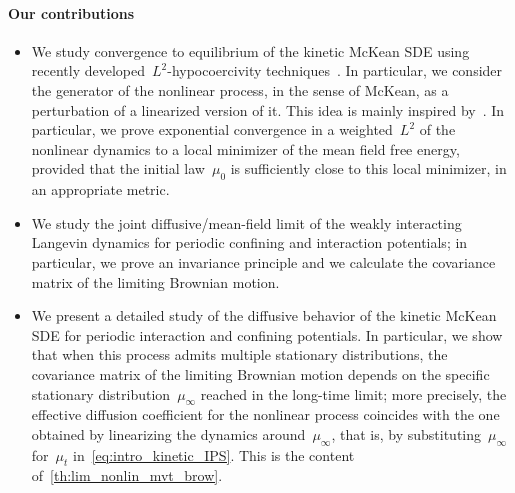 \documentclass[onefignum,onetabnum]{siamart251216} %
\theoremstyle{plain}
\numberwithin{equation}{section}
\numberwithin{theorem}{section}
\newcounter{ucounter}
\newcommand{\uv}[1]{
  \stepcounter{ucounter}
  \textcolor{orange}{
      \\[.2cm]
    U, comment \arabic{ucounter}. #1
    \\[.2cm]
  }
}
\renewcommand{\uv}[1]{\textcolor{orange}{#1}}
\begin{document}
\paragraph{Our contributions} %
\begin{itemize}

    \item
        We study convergence to equilibrium of the kinetic McKean SDE using recently developed~$L^2$-hypocoercivity techniques~\cite{dolbeault2015hypocoercivity,roussel2018spectral}. In particular, we consider the generator of the nonlinear process, in the sense of McKean, as a perturbation of a linearized version of it. This idea is mainly inspired by~\cite{pavliotis2025linearizationergodicmckeansdes}.
        In particular, we prove exponential convergence in a weighted~$L^2$ of the nonlinear dynamics to a local minimizer of the mean field free energy, provided that the initial law~$\mu_0$ is sufficiently close to this local minimizer, in an appropriate metric.
    \item We study the joint diffusive/mean-field limit of the weakly interacting Langevin dynamics for periodic confining and interaction potentials; in particular, we prove an invariance principle and we calculate the covariance matrix of the limiting Brownian motion.


    \item
        We present a detailed study of the diffusive behavior of the kinetic McKean SDE for periodic interaction and confining potentials. In particular, we show that when this process admits multiple stationary distributions,
        the covariance matrix of the limiting Brownian motion depends on the specific stationary distribution~$\mu_{\infty}$ reached in the long-time limit; more precisely, the effective diffusion coefficient for the nonlinear process coincides with the one obtained by linearizing the dynamics around~$\mu_{\infty}$,
        that is, by substituting~$\mu_{\infty}$ for~$\mu_t$ in~\eqref{eq:intro_kinetic_IPS}.
        This is the content of~\cref{th:lim_nonlin_mvt_brow}.



\end{itemize}
\end{document}
